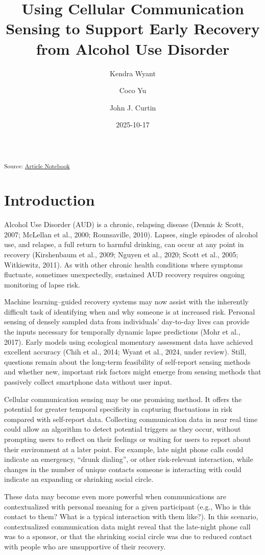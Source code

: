 \documentclass[
  letterpaper,
  DIV=11,
  numbers=noendperiod]{scrartcl}
\title{Using Cellular Communication Sensing to Support Early Recovery
from Alcohol Use Disorder}
\author{Kendra Wyant \and Coco Yu \and John J. Curtin}
\date{2025-10-17}
\begin{document}
\maketitle


\textsubscript{Source:
\href{https://jjcurtin.github.io/study_messages/index.qmd.html}{Article
Notebook}}

\section{Introduction}\label{introduction}

Alcohol Use Disorder (AUD) is a chronic, relapsing disease (Dennis \&
Scott, 2007; McLellan et al., 2000; Rounsaville, 2010). Lapses, single
episodes of alcohol use, and relapse, a full return to harmful drinking,
can occur at any point in recovery (Kirshenbaum et al., 2009; Nguyen et
al., 2020; Scott et al., 2005; Witkiewitz, 2011). As with other chronic
health conditions where symptoms fluctuate, sometimes unexpectedly,
sustained AUD recovery requires ongoing monitoring of lapse risk.

Machine learning--guided recovery systems may now assist with the
inherently difficult task of identifying when and why someone is at
increased risk. Personal sensing of densely sampled data from
individuals' day-to-day lives can provide the inputs necessary for
temporally dynamic lapse predictions (Mohr et al., 2017). Early models
using ecological momentary assessment data have achieved excellent
accuracy (Chih et al., 2014; Wyant et al., 2024, under review). Still,
questions remain about the long-term feasibility of self-report sensing
methods and whether new, important risk factors might emerge from
sensing methods that passively collect smartphone data without user
input.

Cellular communication sensing may be one promising method. It offers
the potential for greater temporal specificity in capturing fluctuations
in risk compared with self-report data. Collecting communication data in
near real time could allow an algorithm to detect potential triggers as
they occur, without prompting users to reflect on their feelings or
waiting for users to report about their environment at a later point.
For example, late night phone calls could indicate an emergency, ``drunk
dialing'', or other risk-relevant interaction, while changes in the
number of unique contacts someone is interacting with could indicate an
expanding or shrinking social circle.

These data may become even more powerful when communications are
contextualized with personal meaning for a given participant (e.g., Who
is this contact to them? What is a typical interaction with them like?).
In this scenario, contextualized communication data might reveal that
the late-night phone call was to a sponsor, or that the shrinking social
circle was due to reduced contact with people who are unsupportive of
their recovery.
\end{document}
